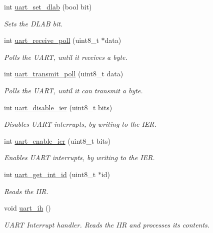 \begin{DoxyCompactItemize}
int \mbox{\hyperlink{group__uart_ga9ebda6fe7f4118ddcd4e4b527d9e31ef}{uart\+\_\+set\+\_\+dlab}} (bool bit)
\begin{DoxyCompactList}\small\item\em Sets the D\+L\+AB bit. \end{DoxyCompactList}\item 
int \mbox{\hyperlink{group__uart_gab2675dc6d0e0ebd9c51d3372a907ba55}{uart\+\_\+receive\+\_\+poll}} (uint8\+\_\+t $\ast$data)
\begin{DoxyCompactList}\small\item\em Polls the U\+A\+RT, until it receives a byte. \end{DoxyCompactList}\item 
int \mbox{\hyperlink{group__uart_ga7c1b3c604c178875b108adfbd853f81f}{uart\+\_\+transmit\+\_\+poll}} (uint8\+\_\+t data)
\begin{DoxyCompactList}\small\item\em Polls the U\+A\+RT, until it can transmit a byte. \end{DoxyCompactList}\item 
int \mbox{\hyperlink{group__uart_gaf05ac9402cb47de033844fb3f86beb31}{uart\+\_\+disable\+\_\+ier}} (uint8\+\_\+t bits)
\begin{DoxyCompactList}\small\item\em Disables U\+A\+RT interrupts, by writing to the I\+ER. \end{DoxyCompactList}\item 
int \mbox{\hyperlink{group__uart_gac9c7676f3d9f44d09e85ab65aa9e9d59}{uart\+\_\+enable\+\_\+ier}} (uint8\+\_\+t bits)
\begin{DoxyCompactList}\small\item\em Enables U\+A\+RT interrupts, by writing to the I\+ER. \end{DoxyCompactList}\item 
int \mbox{\hyperlink{group__uart_ga488f8e4b1795dcbe268f9629176c0740}{uart\+\_\+get\+\_\+int\+\_\+id}} (uint8\+\_\+t $\ast$id)
\begin{DoxyCompactList}\small\item\em Reads the I\+IR. \end{DoxyCompactList}\item 
void \mbox{\hyperlink{group__uart_ga67d2da4dd20c731989c130bbe2cd4c85}{uart\+\_\+ih}} ()
\begin{DoxyCompactList}\small\item\em U\+A\+RT Interrupt handler. Reads the I\+IR and processes its contents. \end{DoxyCompactList}\item 

\end{DoxyCompactItemize}
